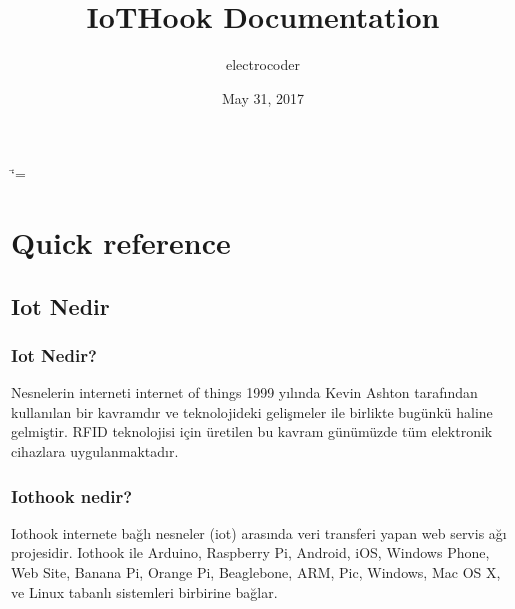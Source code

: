 \documentclass[letterpaper,10pt,turkish]{sphinxmanual}
\title{IoTHook Documentation}
\date{May 31, 2017}
\author{electrocoder}
\begin{document}
\ifnum\catcode`\=\string=\active\shorthandoff{=}\fi
\maketitle
\sphinxtableofcontents
{}\label{\detokenize{index::doc}}



\chapter{Quick reference}
\label{\detokenize{index:iot-hook}}\label{\detokenize{index:icindekiler}}

\section{Iot Nedir}
\label{\detokenize{what-is-iot:iot-nedir}}\label{\detokenize{what-is-iot::doc}}\label{\detokenize{what-is-iot:what-is-iot}}

\subsection{Iot Nedir?}
\label{\detokenize{what-is-iot:id1}}
Nesnelerin interneti \sphinxquotedblleft{}internet of things\sphinxquotedblright{} 1999 yılında Kevin Ashton tarafından kullanılan bir kavramdır
ve teknolojideki gelişmeler ile birlikte bugünkü haline gelmiştir. RFID teknolojisi için
üretilen bu kavram günümüzde tüm elektronik cihazlara uygulanmaktadır.
\begin{figure}[htbp]
\centering
\capstart

\noindent{}
\caption{}\label{\detokenize{what-is-iot:id2}}\end{figure}


\subsection{Iothook nedir?}
\label{\detokenize{what-is-iot:iothook-nedir}}
Iothook internete bağlı nesneler (iot) arasında veri transferi yapan web servis
ağı projesidir. Iothook ile Arduino, Raspberry Pi, Android, iOS, Windows Phone, Web Site, Banana Pi,
Orange Pi, Beaglebone, ARM, Pic, Windows, Mac OS X, ve Linux tabanlı sistemleri birbirine bağlar.
\end{document}
